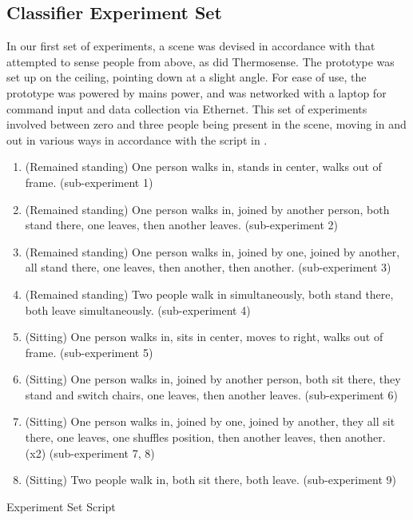 \documentclass[../thesis/thesis.tex]{subfiles}
\begin{document}
\subsection{Classifier Experiment Set}
In our first set of experiments, a scene was devised in accordance with  that attempted to sense people from above, as did Thermosense. The prototype was set up on the ceiling, pointing down at a slight angle. For ease of use, the prototype was powered by mains power, and was networked with a laptop for command input and data collection via Ethernet. This set of experiments involved between zero and three people being present in the scene, moving in and out in various ways in accordance with the script in .

\begin{table}
\centering
\begin{enumerate}
\item (Remained standing) One person walks in, stands in center, walks out of frame. (sub-experiment 1)
\item (Remained standing) One person walks in, joined by another person, both stand there, one leaves, then another leaves. (sub-experiment 2)
\item (Remained standing) One person walks in, joined by one, joined by another, all stand there, one leaves, then another, then another. (sub-experiment 3)
\item (Remained standing) Two people walk in simultaneously, both stand there, both leave simultaneously. (sub-experiment 4)
\item (Sitting) One person walks in, sits in center, moves to right, walks out of frame. (sub-experiment 5)
\item (Sitting) One person walks in, joined by another person, both sit there, they stand and switch chairs, one leaves, then another leaves. (sub-experiment 6)
\item (Sitting) One person walks in, joined by one, joined by another, they all sit there, one leaves, one shuffles position, then another leaves, then another. (x2) (sub-experiment 7, 8)
\item (Sitting) Two people walk in, both sit there, both leave. (sub-experiment 9)
\end{enumerate}
\caption{Experiment Set Script}
\label{tab:exps:3script}
\end{table}
\end{document}
